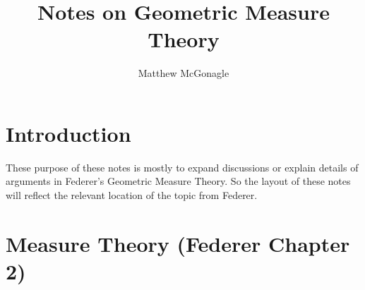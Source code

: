\documentclass{article}
\begin{document}
\title{Notes on Geometric Measure Theory}
\author{Matthew McGonagle}
\maketitle
\section{Introduction}
These purpose of these notes is mostly to expand discussions or explain details of arguments
in Federer's Geometric Measure Theory. So the layout of these notes will reflect the relevant location
of the topic from Federer.

\section{Measure Theory (Federer Chapter 2)}

\end{document}
